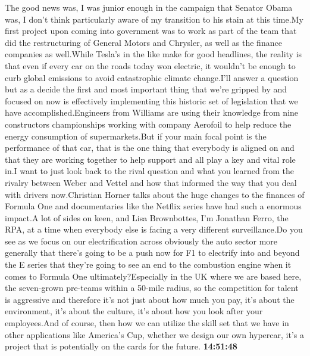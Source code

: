\documentclass{article}%
\begin{document}
The good news was, I was junior enough in the campaign that Senator Obama was, I don't think particularly aware of my transition to his stain at this time.My first project upon coming into government was to work as part of the team that did the restructuring of General Motors and Chrysler, as well as the finance companies as well.While Tesla's in the like make for good headlines, the reality is that even if every car on the roads today won electric, it wouldn't be enough to curb global emissions to avoid catastrophic climate change.I'll answer a question but as a decide the first and most important thing that we're gripped by and focused on now is effectively implementing this historic set of legislation that we have accomplished.Engineers from Williams are using their knowledge from nine constructors championships working with company Aerofoil to help reduce the energy consumption of supermarkets.But if your main focal point is the performance of that car, that is the one thing that everybody is aligned on and that they are working together to help support and all play a key and vital role in.I want to just look back to the rival question and what you learned from the rivalry between Weber and Vettel and how that informed the way that you deal with drivers now.Christian Horner talks about the huge changes to the finances of Formula One and documentaries like the Netflix series have had such a enormous impact.A lot of sides on keen, and Lisa Brownbottes, I'm Jonathan Ferro, the RPA, at a time when everybody else is facing a very different surveillance.Do you see as we focus on our electrification across obviously the auto sector more generally that there's going to be a push now for F1 to electrify into and beyond the E series that they're going to see an end to the combustion engine when it comes to Formula One ultimately?Especially in the UK where we are based here, the seven{-}grown pre{-}teams within a 50{-}mile radius, so the competition for talent is aggressive and therefore it's not just about how much you pay, it's about the environment, it's about the culture, it's about how you look after your employees.And of course, then how we can utilize the skill set that we have in other applications like America's Cup, whether we design our own hypercar, it's a project that is potentially on the cards for the future.%
\textbf{14:51:48}%
\end{document}
